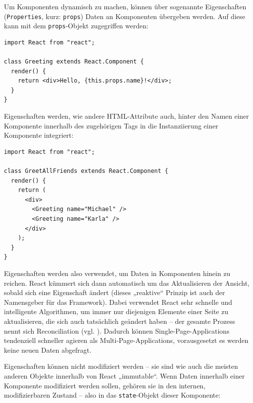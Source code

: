 Um Komponenten dynamisch zu machen, können über sogenannte Eigenschaften (\texttt{Properties}, kurz: \texttt{props}) Daten an Komponenten übergeben werden. Auf diese kann mit dem \texttt{props}-Objekt zugegriffen werden:

\begin{minipage}{\linewidth}
\begin{lstlisting}[caption={Komponenten erhalten Daten über ihre Eigenschaften (props).}]
import React from "react";

class Greeting extends React.Component {
  render() {
    return <div>Hello, {this.props.name}!</div>;
  }
}
\end{lstlisting}
\end{minipage}

Eigenschaften werden, wie andere HTML-Attribute auch, hinter den Namen einer Komponente innerhalb des zugehörigen Tags in die Instanziierung einer Komponente integriert:

\begin{minipage}{\linewidth}
\begin{lstlisting}[caption={Eigenschaften werden wie normale HTML-Attribute verwendet.}]
import React from "react";

class GreetAllFriends extends React.Component {
  render() {
    return (
      <div>
        <Greeting name="Michael" />
        <Greeting name="Karla" />
      </div>
    );
  }
}
\end{lstlisting}
\end{minipage}

Eigenschaften werden also verwendet, um Daten in Komponenten hinein zu reichen. React kümmert sich dann automatisch um das Aktualisieren der Ansicht, sobald sich eine Eigenschaft ändert (dieses „reaktive“ Prinzip ist auch der Namensgeber für das Framework). Dabei verwendet React sehr schnelle und intelligente Algorithmen, um immer nur diejenigen Elemente einer Seite zu aktualisieren, die sich auch tatsächlich geändert haben – der gesamte Prozess nennt sich Reconciliation (vgl. \cite{web:react_reconciliation}). Dadurch können Single-Page-Applications tendenziell schneller agieren als Multi-Page-Applications, vorausgesetzt es werden keine neuen Daten abgefragt.

Eigenschaften können nicht modifiziert werden – sie sind wie auch die meisten anderen Objekte innerhalb von React „immutable“. Wenn Daten innerhalb einer Komponente modifiziert werden sollen, gehören sie in den internen, modifizierbaren Zustand – also in das \texttt{state}-Objekt dieser Komponente:

